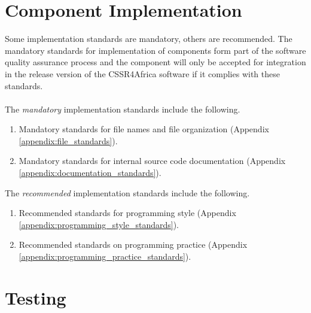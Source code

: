 \documentclass{CSSRforAfrica}
\begin{document}
\section{Component Implementation}
\label{section:component_implementation}

Some implementation standards are mandatory, others are recommended.  The mandatory standards for implementation of components  form part of the software quality assurance process and the component  will only be accepted for integration in the release version of the CSSR4Africa  software if it complies with these standards.  
\\~\\
\noindent The {\em mandatory} implementation standards include the following.   

\begin{enumerate}
\item Mandatory standards for file names and  file organization (Appendix \ref{appendix:file_standards}).
\item Mandatory standards for internal source code documentation  (Appendix \ref{appendix:documentation_standards}).
\end{enumerate}


\noindent The {\em recommended} implementation standards include the following.  
\begin{enumerate}
\item Recommended standards for programming style (Appendix \ref{appendix:programming_style_standards}).
\item Recommended standards on programming practice (Appendix \ref{appendix:programming_practice_standards}).
\end{enumerate}

 
\section{Testing}
\label{section:testing}
\end{document}
